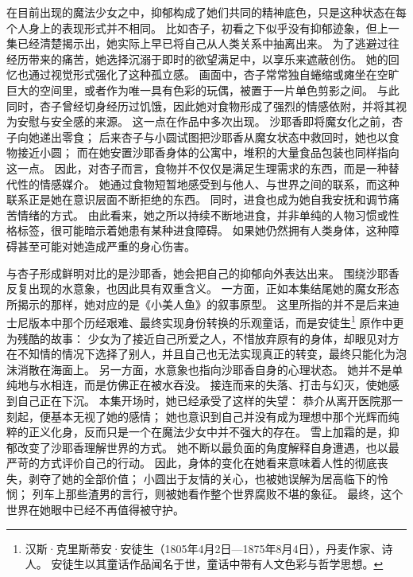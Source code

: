 在目前出现的魔法少女之中，抑郁构成了她们共同的精神底色，只是这种状态在每个人身上的表现形式并不相同。
比如杏子，初看之下似乎没有抑郁迹象，但上一集已经清楚揭示出，她实际上早已将自己从人类关系中抽离出来。
为了逃避过往经历带来的痛苦，她选择沉溺于即时的欲望满足中，以享乐来遮蔽创伤。
她的回忆也通过视觉形式强化了这种孤立感。
画面中，杏子常常独自蜷缩或瘫坐在空旷巨大的空间里，或者作为唯一具有色彩的玩偶，被置于一片单色剪影之间。
与此同时，杏子曾经切身经历过饥饿，因此她对食物形成了强烈的情感依附，并将其视为安慰与安全感的来源。
这一点在作品中多次出现。
沙耶香即将魔女化之前，杏子向她递出零食；
后来杏子与小圆试图把沙耶香从魔女状态中救回时，她也以食物接近小圆；
而在她安置沙耶香身体的公寓中，堆积的大量食品包装也同样指向这一点。
因此，对杏子而言，食物并不仅仅是满足生理需求的东西，而是一种替代性的情感媒介。
她通过食物短暂地感受到与他人、与世界之间的联系，而这种联系正是她在意识层面不断拒绝的东西。
同时，进食也成为她自我安抚和调节痛苦情绪的方式。
由此看来，她之所以持续不断地进食，并非单纯的人物习惯或性格标签，很可能暗示着她患有某种进食障碍。
如果她仍然拥有人类身体，这种障碍甚至可能对她造成严重的身心伤害。

与杏子形成鲜明对比的是沙耶香，她会把自己的抑郁向外表达出来。
围绕沙耶香反复出现的水意象，也因此具有双重含义。
一方面，正如本集结尾她的魔女形态所揭示的那样，她对应的是《小美人鱼》的叙事原型。
这里所指的并不是后来迪士尼版本中那个历经艰难、最终实现身份转换的乐观童话，而是安徒生\footnote{%
    汉斯·克里斯蒂安·安徒生（1805年4月2日—1875年8月4日），丹麦作家、诗人。
    安徒生以其童话作品闻名于世，童话中带有人文色彩与哲学思想。
} 原作中更为残酷的故事：
少女为了接近自己所爱之人，不惜放弃原有的身体，却眼见对方在不知情的情况下选择了别人，并且自己也无法实现真正的转变，最终只能化为泡沫消散在海面上\cite{ref45}。
另一方面，水意象也指向沙耶香自身的心理状态。
她并不是单纯地与水相连，而是仿佛正在被水吞没。
接连而来的失落、打击与幻灭，使她感到自己正在下沉。
本集开场时，她已经承受了这样的失望：
恭介从离开医院那一刻起，便基本无视了她的感情；
她也意识到自己并没有成为理想中那个光辉而纯粹的正义化身，反而只是一个在魔法少女中并不强大的存在。
雪上加霜的是，抑郁改变了沙耶香理解世界的方式。
她不断以最负面的角度解释自身遭遇，也以最严苛的方式评价自己的行动。
因此，身体的变化在她看来意味着人性的彻底丧失，剥夺了她的全部价值；
小圆出于友情的关心，也被她误解为居高临下的怜悯；
列车上那些渣男的言行，则被她看作整个世界腐败不堪的象征。
最终，这个世界在她眼中已经不再值得被守护。

